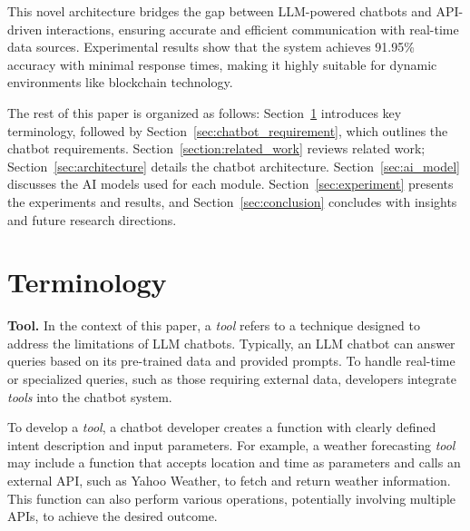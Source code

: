 \documentclass[runningheads]{llncs}
\begin{document}
This novel architecture bridges the gap between LLM-powered chatbots and API-driven interactions, ensuring accurate and efficient communication with real-time data sources. Experimental results show that the system achieves 91.95\% accuracy with minimal response times, making it highly suitable for dynamic environments like blockchain technology.

The rest of this paper is organized as follows: Section~\ref{sec:terminology} introduces key terminology, followed by Section~\ref{sec:chatbot_requirement}, which outlines the chatbot requirements. Section~\ref{section:related_work} reviews related work; Section~\ref{sec:architecture} details the chatbot architecture. Section~\ref{sec:ai_model} discusses the AI models used for each module. Section~\ref{sec:experiment} presents the experiments and results, and Section~\ref{sec:conclusion} concludes with insights and future research directions.






\section{Terminology}
\label{sec:terminology}
\textbf{Tool.}
In the context of this paper, a \textit{tool} refers to a technique designed to address the limitations of LLM chatbots. Typically, an LLM chatbot can answer queries based on its pre-trained data and provided prompts. To handle real-time or specialized queries, such as those requiring external data, developers integrate \textit{tools} into the chatbot system.

To develop a \textit{tool}, a chatbot developer creates a function with clearly defined intent description and input parameters. For example, a weather forecasting \textit{tool} may include a function that accepts location and time as parameters and calls an external API, such as Yahoo Weather, to fetch and return weather information. This function can also perform various operations, potentially involving multiple APIs, to achieve the desired outcome.
\end{document}
